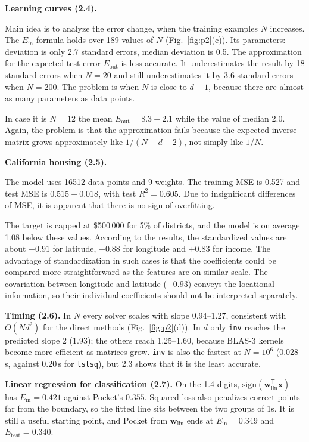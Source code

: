 \documentclass[conference]{IEEEtran}
\newcommand{\Ein}{E_{\mathrm{in}}}
\newcommand{\wlin}{\mathbf{w}_{\mathrm{lin}}}
\newcommand{\x}{\mathbf{x}}
\newcommand{\T}{^{\mathsf T}}
\begin{document}
\textbf{Learning curves (2.4).}

Main idea is to analyze the error change, when the training examples $N$ increases. The $E_{\mathrm{in}}$ formula holds over 189 values of $N$ (Fig.~\ref{fig:p2}(c)). Its parameters: deviation is only 2.7 standard errors, median deviation is 0.5. The approximation for the expected test error $E_{\mathrm{out}}$ is less accurate. It underestimates the result by 18 standard errors when $N=20$ and still underestimates it by 3.6 standard errors when $N=200$. The problem is when $N$ is close to $d+1$, because there are almost as many parameters as data points.

In case it is $N=12$ the mean $E_{\mathrm{out}}=8.3 \pm 2.1$ while the value of median 2.0. Again, the problem is that the approximation fails because the expected inverse matrix grows approximately like $1/(N-d-2)$, not simply like $1/N$.

\textbf{California housing (2.5).}

The model uses 16512 data points and 9 weights. The training MSE is 0.527 and test MSE is $0.515\pm0.018$, with test $R^2=0.605$. Due to insignificant differences of MSE, it is apparent that there is no sign of overfitting.

The target is capped at \$500\,000 for 5\% of districts, and the model is on average 1.08 below these values. According to the results, the standardized values are about $-0.91$ for latitude, $-0.88$ for longitude and $+0.83$ for income. The advantage of standardization in such cases is that the coefficients could be compared more straightforward as the features are on similar scale. The covariation between longitude and latitude ($-0.93$) conveys the locational information, so their individual coefficients should not be interpreted separately.

\textbf{Timing (2.6).} In $N$ every solver scales with slope 0.94--1.27, consistent with $O(Nd^2)$ for the direct methods (Fig.~\ref{fig:p2}(d)). In $d$ only \texttt{inv} reaches the predicted slope 2 (1.93); the others reach 1.25--1.60, because BLAS-3 kernels become more efficient as matrices grow. \texttt{inv} is also the fastest at $N=10^6$ (0.028\,s, against 0.20\,s for \texttt{lstsq}), but 2.3 shows that it is the least accurate.

\textbf{Linear regression for classification (2.7).} On the 1.4 digits, $\mathrm{sign}(\wlin\T\x)$ has $\Ein=0.421$ against Pocket's $0.355$. Squared loss also penalizes correct points far from the boundary, so the fitted line sits between the two groups of 1s. It is still a useful starting point, and Pocket from $\wlin$ ends at $\Ein=0.349$ and $E_{\mathrm{test}}=0.340$.
\end{document}
